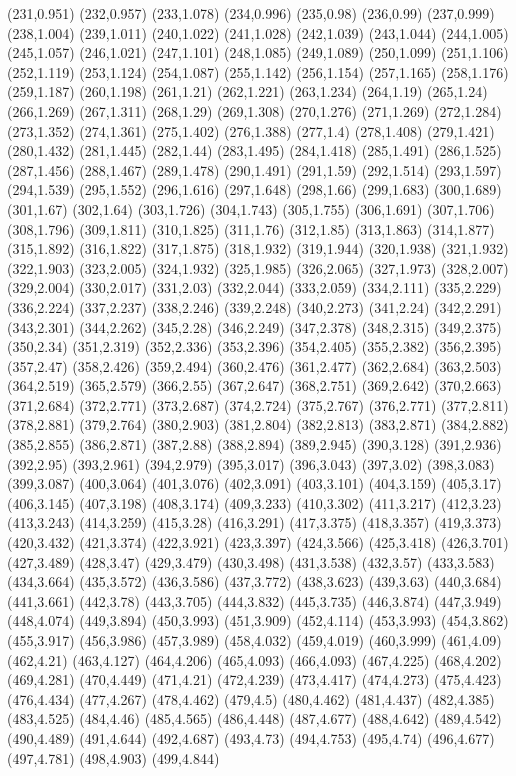 (231,0.951)
(232,0.957)
(233,1.078)
(234,0.996)
(235,0.98)
(236,0.99)
(237,0.999)
(238,1.004)
(239,1.011)
(240,1.022)
(241,1.028)
(242,1.039)
(243,1.044)
(244,1.005)
(245,1.057)
(246,1.021)
(247,1.101)
(248,1.085)
(249,1.089)
(250,1.099)
(251,1.106)
(252,1.119)
(253,1.124)
(254,1.087)
(255,1.142)
(256,1.154)
(257,1.165)
(258,1.176)
(259,1.187)
(260,1.198)
(261,1.21)
(262,1.221)
(263,1.234)
(264,1.19)
(265,1.24)
(266,1.269)
(267,1.311)
(268,1.29)
(269,1.308)
(270,1.276)
(271,1.269)
(272,1.284)
(273,1.352)
(274,1.361)
(275,1.402)
(276,1.388)
(277,1.4)
(278,1.408)
(279,1.421)
(280,1.432)
(281,1.445)
(282,1.44)
(283,1.495)
(284,1.418)
(285,1.491)
(286,1.525)
(287,1.456)
(288,1.467)
(289,1.478)
(290,1.491)
(291,1.59)
(292,1.514)
(293,1.597)
(294,1.539)
(295,1.552)
(296,1.616)
(297,1.648)
(298,1.66)
(299,1.683)
(300,1.689)
(301,1.67)
(302,1.64)
(303,1.726)
(304,1.743)
(305,1.755)
(306,1.691)
(307,1.706)
(308,1.796)
(309,1.811)
(310,1.825)
(311,1.76)
(312,1.85)
(313,1.863)
(314,1.877)
(315,1.892)
(316,1.822)
(317,1.875)
(318,1.932)
(319,1.944)
(320,1.938)
(321,1.932)
(322,1.903)
(323,2.005)
(324,1.932)
(325,1.985)
(326,2.065)
(327,1.973)
(328,2.007)
(329,2.004)
(330,2.017)
(331,2.03)
(332,2.044)
(333,2.059)
(334,2.111)
(335,2.229)
(336,2.224)
(337,2.237)
(338,2.246)
(339,2.248)
(340,2.273)
(341,2.24)
(342,2.291)
(343,2.301)
(344,2.262)
(345,2.28)
(346,2.249)
(347,2.378)
(348,2.315)
(349,2.375)
(350,2.34)
(351,2.319)
(352,2.336)
(353,2.396)
(354,2.405)
(355,2.382)
(356,2.395)
(357,2.47)
(358,2.426)
(359,2.494)
(360,2.476)
(361,2.477)
(362,2.684)
(363,2.503)
(364,2.519)
(365,2.579)
(366,2.55)
(367,2.647)
(368,2.751)
(369,2.642)
(370,2.663)
(371,2.684)
(372,2.771)
(373,2.687)
(374,2.724)
(375,2.767)
(376,2.771)
(377,2.811)
(378,2.881)
(379,2.764)
(380,2.903)
(381,2.804)
(382,2.813)
(383,2.871)
(384,2.882)
(385,2.855)
(386,2.871)
(387,2.88)
(388,2.894)
(389,2.945)
(390,3.128)
(391,2.936)
(392,2.95)
(393,2.961)
(394,2.979)
(395,3.017)
(396,3.043)
(397,3.02)
(398,3.083)
(399,3.087)
(400,3.064)
(401,3.076)
(402,3.091)
(403,3.101)
(404,3.159)
(405,3.17)
(406,3.145)
(407,3.198)
(408,3.174)
(409,3.233)
(410,3.302)
(411,3.217)
(412,3.23)
(413,3.243)
(414,3.259)
(415,3.28)
(416,3.291)
(417,3.375)
(418,3.357)
(419,3.373)
(420,3.432)
(421,3.374)
(422,3.921)
(423,3.397)
(424,3.566)
(425,3.418)
(426,3.701)
(427,3.489)
(428,3.47)
(429,3.479)
(430,3.498)
(431,3.538)
(432,3.57)
(433,3.583)
(434,3.664)
(435,3.572)
(436,3.586)
(437,3.772)
(438,3.623)
(439,3.63)
(440,3.684)
(441,3.661)
(442,3.78)
(443,3.705)
(444,3.832)
(445,3.735)
(446,3.874)
(447,3.949)
(448,4.074)
(449,3.894)
(450,3.993)
(451,3.909)
(452,4.114)
(453,3.993)
(454,3.862)
(455,3.917)
(456,3.986)
(457,3.989)
(458,4.032)
(459,4.019)
(460,3.999)
(461,4.09)
(462,4.21)
(463,4.127)
(464,4.206)
(465,4.093)
(466,4.093)
(467,4.225)
(468,4.202)
(469,4.281)
(470,4.449)
(471,4.21)
(472,4.239)
(473,4.417)
(474,4.273)
(475,4.423)
(476,4.434)
(477,4.267)
(478,4.462)
(479,4.5)
(480,4.462)
(481,4.437)
(482,4.385)
(483,4.525)
(484,4.46)
(485,4.565)
(486,4.448)
(487,4.677)
(488,4.642)
(489,4.542)
(490,4.489)
(491,4.644)
(492,4.687)
(493,4.73)
(494,4.753)
(495,4.74)
(496,4.677)
(497,4.781)
(498,4.903)
(499,4.844)
